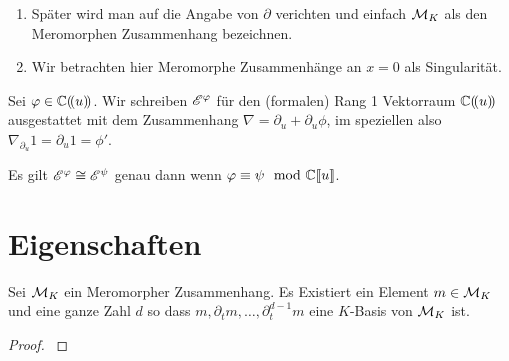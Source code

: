 \begin{bem}
  \begin{enumerate}
    \item Später wird man auf die Angabe von $\partial$ verichten und einfach
      $\mathcal{M}_K$ als den Meromorphen Zusammenhang bezeichnen.
    \item Wir betrachten hier Meromorphe Zusammenhänge an $x=0$ als
      Singularität.
  \end{enumerate}
\end{bem}

\begin{defn}
  \cite[1.a]{sabbah_Fourier-local}
  Sei $\varphi\in\mathbb{C}(\!(u)\!)$.
  Wir schreiben $\mathscr{E}^\varphi$ für den (formalen) Rang 1 Vektorraum $\mathbb{C}(\!(u)\!)$
  ausgestattet mit dem Zusammenhang $\nabla=\partial_u+\partial_u\phi$, im
  speziellen also $\nabla_{\partial_u}1=\partial_u1=\phi'$.\\

\end{defn}

\begin{bem}
  \cite[1.a]{sabbah_Fourier-local}
  Es gilt $\mathscr{E}^\varphi\cong\mathscr{E}^\psi$ genau dann wenn $\varphi\equiv\psi \mod {{\mathbb C\llbracket u\rrbracket}}$.
\end{bem}

\section{Eigenschaften}

\begin{lem}
  \cite[Thm 4.3.3]{sabbah_cimpa90}
  \cite[Satz 4.8]{ZulaBarbara}
  Sei $\mathcal{M}_K$ ein Meromorpher Zusammenhang. Es Existiert ein Element
  $m\in\mathcal{M}_K$ und eine ganze Zahl $d$ so dass
  $m,\partial_tm,\dots,\partial_t^{d-1}m$ eine $K$-Basis von $\mathcal{M}_K$ ist.
\end{lem}
\begin{proof}
  \cite[Satz 4.8]{ZulaBarbara}
\end{proof}

